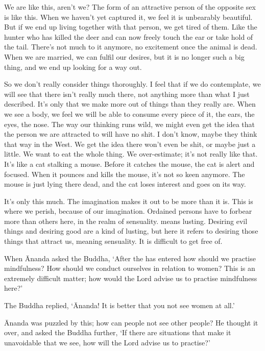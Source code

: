 We are like this, aren't we? The form of an attractive person of the opposite sex is like this. When we haven't yet captured it, we feel it is unbearably beautiful. But if we end up living together with that person, we get tired of them. Like the hunter who has killed the deer and can now freely touch the ear or take hold of the tail. There's not much to it anymore, no excitement once the animal is dead. When we are married, we can fulfil our desires, but it is no longer such a big thing, and we end up looking for a way out.

So we don't really consider things thoroughly. I feel that if we do contemplate, we will see that there isn't really much there, not anything more than what I just described. It's only that we make more out of things than they really are. When we see a body, we feel we will be able to consume every piece of it, the ears, the eyes, the nose. The way our thinking runs wild, we might even get the idea that the person we are attracted to will have no shit. I don't know, maybe they think that way in the West. We get the idea there won't even be shit, or maybe just a little. We want to eat the whole thing. We over-estimate; it's not really like that. It's like a cat stalking a mouse. Before it catches the mouse, the cat is alert and focused. When it pounces and kills the mouse, it's not so keen anymore. The mouse is just lying there dead, and the cat loses interest and goes on its way.

It's only this much. The imagination makes it out to be more than it is. This is where we perish, because of our imagination. Ordained persons have to forbear more than others here, in the realm of sensuality.  means lusting. Desiring evil things and desiring good are a kind of lusting, but here it refers to desiring those things that attract us, meaning sensuality. It is difficult to get free of.

When \=Ananda asked the Buddha, `After the  has entered  how should we practise mindfulness? How should we conduct ourselves in relation to women? This is an extremely difficult matter; how would the Lord advise us to practise mindfulness here?'

The Buddha replied, `\=Ananda! It is better that you not see women at all.'

\=Ananda was puzzled by this; how can people not see other people? He thought it over, and asked the Buddha further, `If there are situations that make it unavoidable that we see, how will the Lord advise us to practise?'

